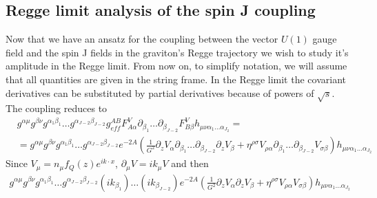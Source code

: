 \documentclass[a4paper,12pt]{article}
\begin{document}
\subsection{Regge limit analysis of the spin J coupling}
Now that we have an ansatz for the coupling between the vector $U(1)$ gauge field and the spin J fields in the graviton's Regge trajectory we wish to study it's amplitude in the Regge limit. From now on, to simplify notation, we will assume that all quantities are given in the string frame. In the Regge limit the covariant derivatives can be substituted by partial derivatives because of powers of $\sqrt{s}$. The coupling reduces to
\begin{align}
&g^{\alpha \mu} g^{\beta \nu} g^{\alpha_1 \beta_1} \dots g^{\alpha_{J-2} \beta_{J-2}} g^{AB}_{eff} F^{V}_{A \alpha} \partial_{\beta_1} \dots \partial_{\beta_{J-2}} F^{V}_{B \beta} h_{\mu \nu \alpha_1 \dots \alpha_{J_2}} = \\
& = g^{\alpha \mu} g^{\beta \nu} g^{\alpha_1 \beta_1} \dots g^{\alpha_{J-2} \beta_{J-2}} e^{-2A} \left( \frac{1}{G^2} \partial_z V_\alpha \partial_{\beta_1} \dots \partial_{\beta_{J-2}} \partial_z V_\beta + \eta^{\rho \sigma} V_{\rho \alpha} \partial_{\beta_1} \dots \partial_{\beta_{J-2}} V_{\sigma \beta} \right) h_{\mu \nu \alpha_1 \dots \alpha_{J_2}}
\end{align}
Since $V_\mu = n_\mu f_Q \left( z\right) e^{i k \cdot x}$, $\partial_\mu V = i k_\mu V$ and then
\begin{align}
g^{\alpha \mu} g^{\beta \nu} g^{\alpha_1 \beta_1} \dots g^{\alpha_{J-2} \beta_{J-2}} \left( i k_{\beta_1}\right) \dots  \left( i k_{\beta_{J-2}}\right) e^{-2A} \left( \frac{1}{G^2} \partial_z V_\alpha  \partial_z V_\beta + \eta^{\rho \sigma} V_{\rho \alpha} V_{\sigma \beta} \right) h_{\mu \nu \alpha_1 \dots \alpha_{J_2}}
\end{align}
\end{document}
